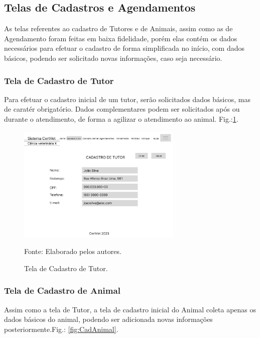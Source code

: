 \documentclass[
    12pt,               %
    openright,          %
    oneside,
    a4paper,            %
    BIBLATEX,           %
    TODO,               %
    english,            %
    brazil              %
    ]{ifsp-spo-inf-ctds}
\begin{document}
    \subsection{Telas de Cadastros e Agendamentos}

As telas referentes ao cadastro de Tutores e de Animais, assim como as de Agendamento foram feitas em baixa fidelidade, porém elas contém os dados necessários para efetuar o cadastro de forma simplificada no início, com dados básicos, podendo ser solicitado novas informações, caso seja necessário.

\subsubsection{Tela de Cadastro de Tutor}
Para efetuar o cadastro inicial de um tutor, serão solicitados dados básicos, mas de caratér obrigatório. Dados complementares podem ser solicitados após ou durante o atendimento, de forma a agilizar o atendimento ao animal. Fig.:\ref{fig:CadTutor}.

\begin{figure}[H]
                \centering
                \caption{Tela de Cadastro de Tutor.}
                \includegraphics[width=0.7\textwidth]{images/Telas/Cadastro Tutor.png}
                
                \label{fig:CadTutor}
                \centering
        {\footnotesize Fonte: Elaborado pelos autores.}
            \end{figure}    


\subsubsection{Tela de Cadastro de Animal}
Assim como a tela de Tutor, a tela de cadastro inicial do Animal coleta apenas os dados básicos do animal, podendo ser adicionada novas informações posteriormente.Fig.: \ref{fig:CadAnimal}.
\end{document}
